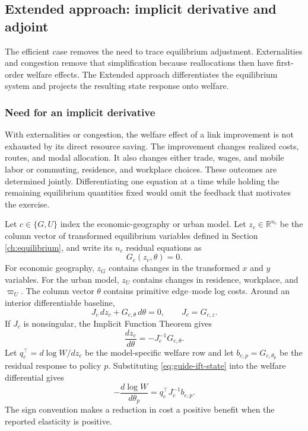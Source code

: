 \subsection{Extended approach: implicit derivative and adjoint}
\label{ch:ift}

The efficient case removes the need to trace equilibrium adjustment.
Externalities and congestion remove that simplification because reallocations
then have first-order welfare effects. The Extended approach differentiates
the equilibrium system and projects the resulting state response onto welfare.

\subsubsection{Need for an implicit derivative}

With externalities or congestion, the welfare effect of a link improvement is
not exhausted by its direct resource saving. The improvement changes realized
costs, routes, and modal allocation. It also changes either trade, wages, and
mobile labor or commuting, residence, and workplace choices. These outcomes
are determined jointly. Differentiating one equation at a time while holding
the remaining equilibrium quantities fixed would omit the feedback that
motivates the exercise.

Let \(c\in\{G,U\}\) index the economic-geography or urban model. Let
\(z_c\in\mathbb R^{n_c}\) be the column vector of transformed equilibrium
variables defined in Section \ref{ch:equilibrium}, and write its \(n_c\)
residual equations as
\begin{equation}
  G_c(z_c,\theta)=0.
\label{eq:guide-residual}
\end{equation}
For economic geography, \(z_G\) contains changes in the transformed \(x\) and
\(y\) variables. For the urban model, \(z_U\) contains changes in residence,
workplace, and \(\varpi_U\). The column vector \(\theta\) contains primitive
edge--mode log costs. Around an interior differentiable baseline,
\[
 J_c\,dz_c+G_{c,\theta}\,d\theta=0,
 \qquad
 J_c=G_{c,z}.
\]
If \(J_c\) is nonsingular, the Implicit Function Theorem gives
\begin{equation}
 \frac{dz_c}{d\theta}=-J_c^{-1}G_{c,\theta}.
\label{eq:guide-ift-state}
\end{equation}
Let \(q_c^\top=d\log W/dz_c\) be the model-specific welfare row and let
\(b_{c,p}=G_{c,\theta_p}\) be the residual response to policy \(p\).
Substituting \eqref{eq:guide-ift-state} into the welfare differential gives
\begin{equation}
 -\frac{d\log W}{d\theta_p}
 =q_c^\top J_c^{-1}b_{c,p}.
\label{eq:guide-ift-welfare}
\end{equation}
The sign convention makes a reduction in cost a positive benefit when the
reported elasticity is positive.

